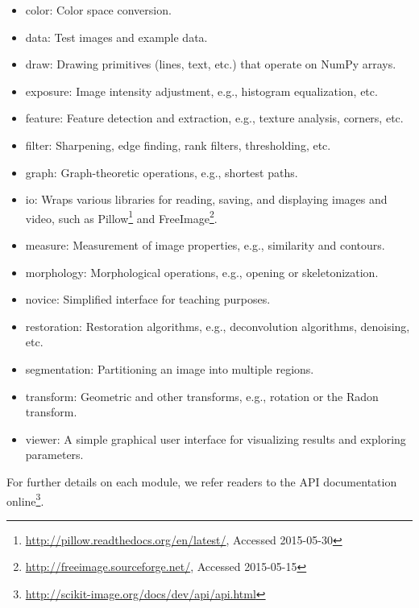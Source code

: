   \begin{itemize}

    \item color: Color space conversion.
    \item data: Test images and example data.
    \item draw: Drawing primitives (lines, text, etc.) that operate on NumPy arrays.
    \item exposure: Image intensity adjustment, e.g., histogram equalization, etc.
    \item feature: Feature detection and extraction, e.g., texture analysis, corners, etc.
    \item filter: Sharpening, edge finding, rank filters, thresholding, etc.
    \item graph: Graph-theoretic operations, e.g., shortest paths.
    \item io: Wraps various libraries for reading, saving, and displaying images and video, such as Pillow\footnote{\url{http://pillow.readthedocs.org/en/latest/}, Accessed 2015-05-30} and FreeImage\footnote{\url{http://freeimage.sourceforge.net/}, Accessed 2015-05-15}.
    \item measure: Measurement of image properties, e.g., similarity and contours.
    \item morphology: Morphological operations, e.g., opening or skeletonization.
    \item novice: Simplified interface for teaching purposes.
    \item restoration: Restoration algorithms, e.g., deconvolution algorithms, denoising, etc.
    \item segmentation: Partitioning an image into multiple regions.
    \item transform: Geometric and other transforms, e.g., rotation or the Radon transform.
    \item viewer: A simple graphical user interface for visualizing results and exploring parameters.

  \end{itemize}

  For further details on each module, we refer readers to the API documentation
  online\footnote{\url{http://scikit-image.org/docs/dev/api/api.html}}.
